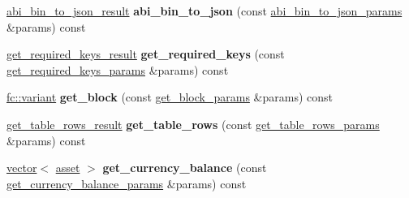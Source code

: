 \begin{DoxyCompactItemize}
\mbox{\hyperlink{structaacio_1_1chain__apis_1_1read__only_1_1abi__bin__to__json__result}{abi\+\_\+bin\+\_\+to\+\_\+json\+\_\+result}} {\bfseries abi\+\_\+bin\+\_\+to\+\_\+json} (const \mbox{\hyperlink{structaacio_1_1chain__apis_1_1read__only_1_1abi__bin__to__json__params}{abi\+\_\+bin\+\_\+to\+\_\+json\+\_\+params}} \&params) const
\item 
\mbox{\label{classaacio_1_1chain__apis_1_1read__only_a7deb23016be6159dde47ea27aa23a5a1}} 
\mbox{\hyperlink{structaacio_1_1chain__apis_1_1read__only_1_1get__required__keys__result}{get\+\_\+required\+\_\+keys\+\_\+result}} {\bfseries get\+\_\+required\+\_\+keys} (const \mbox{\hyperlink{structaacio_1_1chain__apis_1_1read__only_1_1get__required__keys__params}{get\+\_\+required\+\_\+keys\+\_\+params}} \&params) const
\item 
\mbox{\label{classaacio_1_1chain__apis_1_1read__only_a1998d4021e1d92bc88dbfba79c4a5b4d}} 
\mbox{\hyperlink{classfc_1_1variant}{fc\+::variant}} {\bfseries get\+\_\+block} (const \mbox{\hyperlink{structaacio_1_1chain__apis_1_1read__only_1_1get__block__params}{get\+\_\+block\+\_\+params}} \&params) const
\item 
\mbox{\label{classaacio_1_1chain__apis_1_1read__only_abafef15f986103ab0beea1754271fddc}} 
\mbox{\hyperlink{structaacio_1_1chain__apis_1_1read__only_1_1get__table__rows__result}{get\+\_\+table\+\_\+rows\+\_\+result}} {\bfseries get\+\_\+table\+\_\+rows} (const \mbox{\hyperlink{structaacio_1_1chain__apis_1_1read__only_1_1get__table__rows__params}{get\+\_\+table\+\_\+rows\+\_\+params}} \&params) const
\item 
\mbox{\label{classaacio_1_1chain__apis_1_1read__only_a421c0de9e5ae4ff75b6b125e29d06a1f}} 
\mbox{\hyperlink{classstd_1_1vector}{vector}}$<$ \mbox{\hyperlink{structaacio_1_1asset}{asset}} $>$ {\bfseries get\+\_\+currency\+\_\+balance} (const \mbox{\hyperlink{structaacio_1_1chain__apis_1_1read__only_1_1get__currency__balance__params}{get\+\_\+currency\+\_\+balance\+\_\+params}} \&params) const
\item 
\mbox{\label{classaacio_1_1chain__apis_1_1read__only_af04d56c3e4e2e80e81b6d06f444122d0}} 

\end{DoxyCompactItemize}
